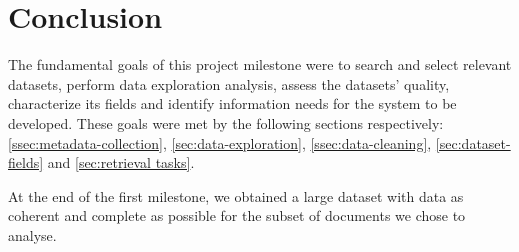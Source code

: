 \documentclass[sigconf, authorversion]{acmart}
\begin{document}
\section{Conclusion}

The fundamental goals of this project milestone were to search and select relevant datasets, perform data exploration analysis, assess the datasets' quality, characterize its fields and identify information needs for the system to be developed.
These goals were met by the following sections respectively: \ref{ssec:metadata-collection}, \ref{sec:data-exploration}, \ref{ssec:data-cleaning}, \ref{sec:dataset-fields} and \ref{sec:retrieval tasks}.

At the end of the first milestone, we obtained a large dataset with data as coherent and complete as possible for the subset of documents we chose to analyse.



% 
\end{document}
